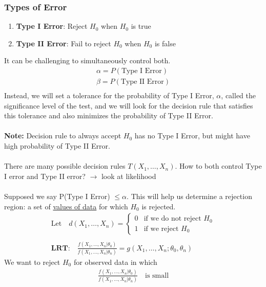 \subsubsection*{Types of Error}
\begin{enumerate}[label=\protect\circled{\arabic*}]
	\item \textbf{Type I Error}: Reject $H_0$ when $H_0$ is true
	\item \textbf{Type II Error}: Fail to reject $H_0$ when $H_0$ is false
\end{enumerate}
It can be challenging to simultaneously control both.
\begin{gather*}
	\alpha = P(\text{Type I Error})\\
	\beta = P(\text{Type II Error})\\
\end{gather*}
Instead, we will set a tolerance for the probability of Type I Error, $\alpha$, called the significance level of the test, and we will look for the decision rule that satisfies this tolerance and also minimizes the probability of Type II Error.\\\\
\textbf{Note:} Decision rule to always accept $H_0$ has no Type I Error, but might have high probability of Type II Error.\\\\
There are many possible decision rules \quad 
$T(X_1, \ldots, X_n)$. How to both control Type I error and Type II error? $\rightarrow$ look at likelihood\\\\
Supposed we say P(Type I Error) $\leq \alpha$. This will help us determine a rejection region: a set of \underline{values of data} for which $H_0$ is rejected.
\begin{gather*}
	\text{Let} \quad d(X_1, \ldots, X_n) = \begin{cases}
		0 & \text{if we do not reject $H_0$}\\
		1 & \text{if we reject $H_0$}
	\end{cases}\\\\
	\textbf{LRT:} \quad \frac{f(X_1, \ldots, X_n | \theta_0)}{f(X_1, \ldots, X_n | \theta_n)} = g(X_1, \ldots, X_n; \theta_0, \theta_n)
\end{gather*}
We want to reject $H_0$ for observed data in which
\begin{gather*}
	\frac{f(X_1, \ldots, X_n | \theta_0)}{f(X_1, \ldots, X_n | \theta_n)} \quad \text{is small}
\end{gather*}
